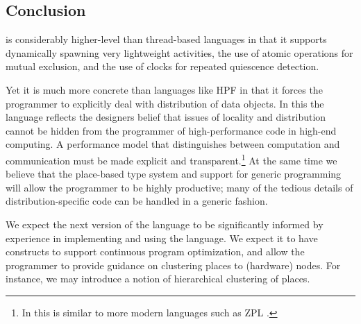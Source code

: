 \subsection{Conclusion}
{}\Xten{} is considerably higher-level than thread-based languages in
that it supports dynamically spawning very lightweight activities, the
use of atomic operations for mutual exclusion, and the use of clocks
for repeated quiescence detection.

Yet it is much more concrete than languages like HPF in
that it forces the programmer to explicitly deal with distribution of
data objects. In this the language reflects the designers belief that
issues of locality and distribution cannot be hidden from the
programmer of high-performance code in high-end computing.  A
performance model that distinguishes between computation and
communication must be made explicit and transparent.\footnote{In this
\Xten{} is similar to more modern languages such as ZPL \cite{zpl}.} At
the same time we believe that the place-based type system and support
for generic programming will allow the \Xten{} programmer to be highly
productive; many of the tedious details of distribution-specific code
can be handled in a generic fashion.

We expect the next version of the language to be significantly
informed by experience in implementing and using the language. We
expect it to have constructs to support continuous program
optimization, and allow the programmer to provide guidance on
clustering places to (hardware) nodes. For instance, we may introduce
a notion of hierarchical clustering of places.




